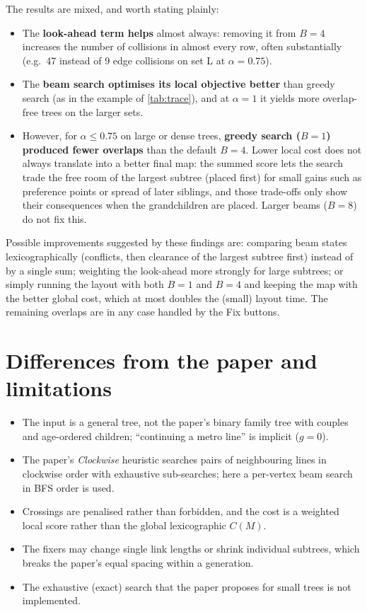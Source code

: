 \documentclass[11pt,a4paper]{article}
\begin{document}
The results are mixed, and worth stating plainly:
\begin{itemize}
  \item The \textbf{look-ahead term helps} almost always: removing it from $B=4$ increases the number of collisions in almost every row, often substantially (e.g.\ 47 instead of 9 edge collisions on set L at $\alpha=0.75$).
  \item The \textbf{beam search optimises its local objective better} than greedy search (as in the example of \cref{tab:trace}), and at $\alpha=1$ it yields more overlap-free trees on the larger sets.
  \item However, for $\alpha\le0.75$ on large or dense trees, \textbf{greedy search ($B=1$) produced fewer overlaps} than the default $B=4$. Lower local cost does not always translate into a better final map: the summed score lets the search trade the free room of the largest subtree (placed first) for small gains such as preference points or spread of later siblings, and those trade-offs only show their consequences when the grandchildren are placed. Larger beams ($B=8$) do not fix this.
\end{itemize}
Possible improvements suggested by these findings are: comparing beam states lexicographically (conflicts, then clearance of the largest subtree first) instead of by a single sum; weighting the look-ahead more strongly for large subtrees; or simply running the layout with both $B=1$ and $B=4$ and keeping the map with the better global cost, which at most doubles the (small) layout time. The remaining overlaps are in any case handled by the Fix buttons.

\section{Differences from the paper and limitations}

\begin{itemize}
  \item The input is a general tree, not the paper's binary family tree with couples and age-ordered children; ``continuing a metro line'' is implicit ($g=0$).
  \item The paper's \emph{Clockwise} heuristic searches pairs of neighbouring lines in clockwise order with exhaustive sub-searches; here a per-vertex beam search in BFS order is used.
  \item Crossings are penalised rather than forbidden, and the cost is a weighted local score rather than the global lexicographic $C(M)$.
  \item The fixers may change single link lengths or shrink individual subtrees, which breaks the paper's equal spacing within a generation.
  \item The exhaustive (exact) search that the paper proposes for small trees is not implemented.
\end{itemize}
\end{document}
